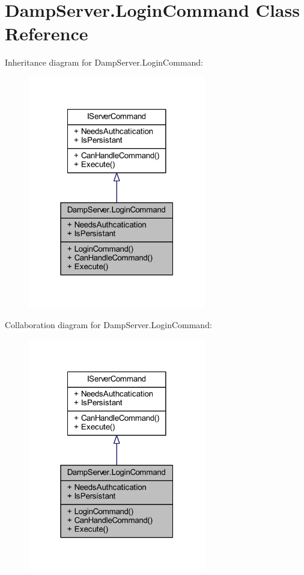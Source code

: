 \hypertarget{class_damp_server_1_1_login_command}{\section{Damp\-Server.\-Login\-Command Class Reference}
\label{class_damp_server_1_1_login_command}
}


Inheritance diagram for Damp\-Server.\-Login\-Command\-:\nopagebreak
\begin{figure}[H]
\begin{center}
\leavevmode
\includegraphics[width=220pt]{class_damp_server_1_1_login_command__inherit__graph}
\end{center}
\end{figure}


Collaboration diagram for Damp\-Server.\-Login\-Command\-:\nopagebreak
\begin{figure}[H]
\begin{center}
\leavevmode
\includegraphics[width=220pt]{class_damp_server_1_1_login_command__coll__graph}
\end{center}
\end{figure}
